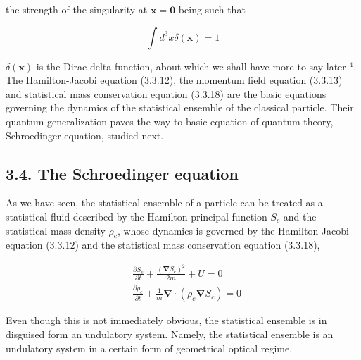 \documentclass{article}
\begin{document}
the strength of the singularity at $\boldsymbol{x}=\mathbf{0}$ being such that
 
\begin{equation*}
\int d^{3} x \delta(\boldsymbol{x})=1 \tag{3.3.22}
\end{equation*}
 
$\delta(\boldsymbol{x})$ is the Dirac delta function, about which we shall have more to say later ${ }^{4}$.
The Hamilton-Jacobi equation (3.3.12), the momentum field equation (3.3.13) and statistical mass conservation equation (3.3.18) are the basic equations governing the dynamics of the statistical ensemble of the classical particle. Their quantum generalization paves the way to basic equation of quantum theory, Schroedinger equation, studied next.


\subsection*{3.4. The Schroedinger equation}

As we have seen, the statistical ensemble of a particle can be treated as a statistical fluid described by the Hamilton principal function $S_{c}$ and the statistical mass density $\rho_{c}$, whose dynamics is governed by the Hamilton-Jacobi equation (3.3.12) and the statistical mass conservation equation (3.3.18),
 
\begin{align*}
& \frac{\partial S_{c}}{\partial t}+\frac{\left(\boldsymbol{\nabla} S_{c}\right)^{2}}{2 m}+U=0  \tag{3.4.1}\\
& \frac{\partial \rho_{c}}{\partial t}+\frac{1}{m} \boldsymbol{\nabla} \cdot\left(\rho_{c} \boldsymbol{\nabla} S_{c}\right)=0 \tag{3.4.2}
\end{align*}
 

Even though this is not immediately obvious, the statistical ensemble is in disguised form an undulatory system. Namely,
the statistical ensemble is an undulatory system in a certain form of geometrical optical regime.
\end{document}
